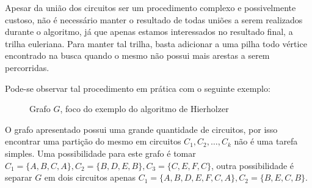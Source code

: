 \documentclass[12pt, a4paper]{article}
\begin{document}
Apesar da união dos circuitos ser um procedimento complexo e possivelmente custoso, não é necessário manter o resultado de todas uniões a serem realizados durante o algoritmo, já que apenas estamos interessados no resultado final, a trilha euleriana.
Para manter tal trilha, basta adicionar a uma pilha todo vértice encontrado na busca quando o mesmo não possui mais arestas a serem percorridas.

Pode-se observar tal procedimento em prática com o seguinte exemplo:

\begin{figure}[H]
    \center
    \caption{Grafo $G$, foco do exemplo do algoritmo de Hierholzer}
\end{figure}

\sloppy O grafo apresentado possui uma grande quantidade de circuitos, por isso encontrar uma partição do mesmo em circuitos $C_1, C_2, \dots, C_k$ não é uma tarefa simples.
Uma possibilidade para este grafo é tomar $C_1 = \{A, B, C, A\}, C_2 = \{B, D, E, B\}, C_3 = \{C, E, F, C\}$, outra possibilidade é separar $G$ em dois circuitos apenas $C_1 = \{A, B, D, E, F, C, A\}, C_2 = \{B, E, C, B\}$.
\end{document}
